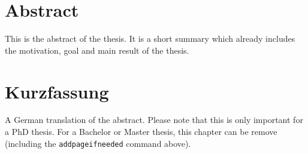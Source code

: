 \chapter*{Abstract}

This is the abstract of the thesis. It is a short summary which already includes the motivation, goal and main result of the thesis.

\addpageifneeded
\chapter*{Kurzfassung}

A German translation of the abstract. Please note that this is only important for a PhD thesis. For a Bachelor or Master thesis, this chapter can be remove (including the \texttt{addpageifneeded} command above).